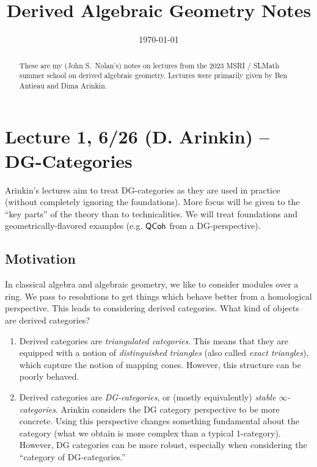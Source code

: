 \documentclass{amsart}
\title{Derived Algebraic Geometry Notes}
\date{\today}
\begin{document}
\begin{abstract}
	These are my (John S.\ Nolan's) notes on lectures from the 2023 MSRI / SLMath summer school on derived algebraic geometry.
	Lectures were primarily given by Ben Antieau and Dima Arinkin.
\end{abstract}


\maketitle

\tableofcontents

\section{Lecture 1, 6/26 (D. Arinkin) -- DG-Categories}

Arinkin's lectures aim to treat DG-categories as they are used in practice (without completely ignoring the foundations).
More focus will be given to the ``key parts'' of the theory than to technicalities.
We will treat foundations and geometrically-flavored examples (e.g. $\mathsf{QCoh}$ from a DG-perspective).

\subsection{Motivation}

In classical algebra and algebraic geometry, we like to consider modules over a ring.
We pass to resolutions to get things which behave better from a homological perspective.
This leads to considering derived categories.
What kind of objects are derived categories?

\begin{enumerate}
\item Derived categories are \emph{triangulated categories}.
This means that they are equipped with a notion of \emph{distinguished triangles} (also called \emph{exact triangles}), which capture the notion of mapping cones.
However, this structure can be poorly behaved.
\item Derived categories are \emph{DG-categories}, or (mostly equivalently) \emph{stable $\infty$-categories}.
Arinkin considers the DG category perspective to be more concrete.
Using this perspective changes something fundamental about the category (what we obtain is more complex than a typical $1$-category).
However, DG categories can be more robust, especially when considering the ``category of DG-categories.''
\end{enumerate}
\end{document}
